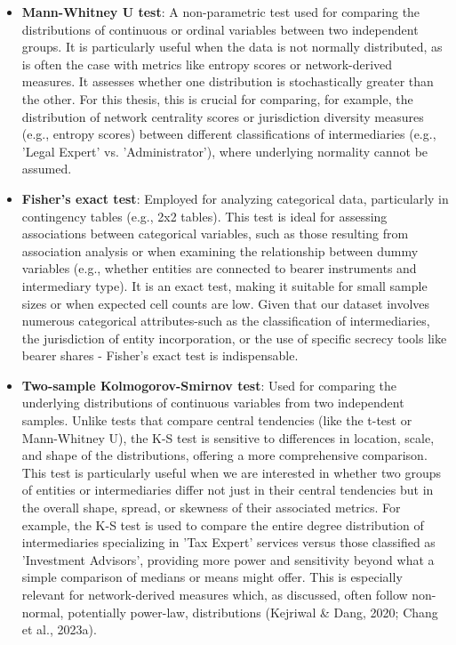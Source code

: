 \begin{itemize}
    \item \textbf{Mann-Whitney U test}: A non-parametric test used for comparing the distributions of continuous or ordinal variables between two independent groups. It is particularly useful when the data is not normally distributed, as is often the case with metrics like entropy scores or network-derived measures. It assesses whether one distribution is stochastically greater than the other. For this thesis, this is crucial for comparing, for example, the distribution of network centrality scores or jurisdiction diversity measures (e.g., entropy scores) between different classifications of intermediaries (e.g., 'Legal Expert' vs. 'Administrator'), where underlying normality cannot be assumed.

    \item \textbf{Fisher's exact test}: Employed for analyzing categorical data, particularly in contingency tables (e.g., 2x2 tables). This test is ideal for assessing associations between categorical variables, such as those resulting from association analysis or when examining the relationship between dummy variables (e.g., whether entities are connected to bearer instruments and intermediary type). It is an exact test, making it suitable for small sample sizes or when expected cell counts are low. Given that our dataset involves numerous categorical attributes-such as the classification of intermediaries, the jurisdiction of entity incorporation, or the use of specific secrecy tools like bearer shares - Fisher's exact test is indispensable.

    \item \textbf{Two-sample Kolmogorov-Smirnov test}: Used for comparing the underlying distributions of continuous variables from two independent samples. Unlike tests that compare central tendencies (like the t-test or Mann-Whitney U), the K-S test is sensitive to differences in location, scale, and shape of the distributions, offering a more comprehensive comparison. This test is particularly useful when we are interested in whether two groups of entities or intermediaries differ not just in their central tendencies but in the overall shape, spread, or skewness of their associated metrics. For example, the K-S test is used to compare the entire degree distribution of intermediaries specializing in 'Tax Expert' services versus those classified as 'Investment Advisors', providing more power and sensitivity beyond what a simple comparison of medians or means might offer. This is especially relevant for network-derived measures which, as discussed, often follow non-normal, potentially power-law, distributions (Kejriwal \& Dang, 2020; Chang et al., 2023a).
\end{itemize}

